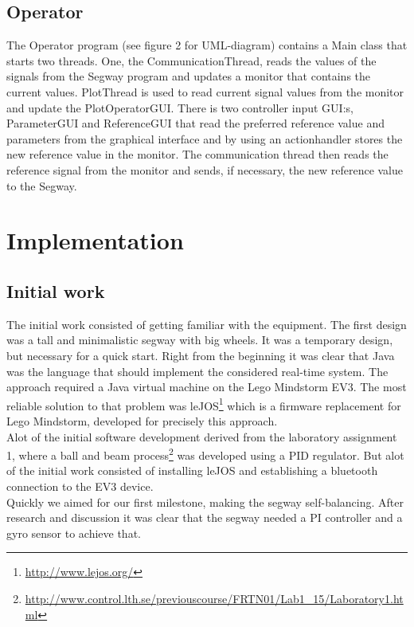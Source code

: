 \subsection{Operator}
The Operator program (see figure 2 for UML-diagram)  contains a Main class that starts two threads. One, the CommunicationThread, reads the values of the signals from the Segway program and updates a monitor that contains the current values. PlotThread is used to read current signal values from the monitor and update the PlotOperatorGUI. There is two controller input GUI:s, ParameterGUI and ReferenceGUI that read the preferred reference value and parameters from the graphical interface and by using an actionhandler stores the new reference value in the monitor. The communication thread then reads the reference signal from the monitor and sends, if necessary, the new reference value to the Segway.

  
\section{Implementation}
\subsection{Initial work}
The initial work consisted of getting familiar with the equipment. The first design was a tall and minimalistic segway with big wheels. It was a temporary design, but necessary for a quick start. Right from the beginning it was clear that Java was the language that should implement the considered real-time system. The approach required a Java virtual machine on the Lego Mindstorm EV3. The most reliable solution to that problem was leJOS\footnote{\url{http://www.lejos.org/}} which is a firmware replacement for Lego Mindstorm, developed for precisely this approach. 
\\[3ex]
Alot of the initial software development derived from the laboratory assignment 1, where a ball and beam process\footnote{\url{http://www.control.lth.se/previouscourse/FRTN01/Lab1_15/Laboratory1.html}} was developed using a PID regulator. But alot of the initial work consisted of installing leJOS and establishing a bluetooth connection to the EV3 device. 
\\[3ex]
Quickly we aimed for our first milestone, making the segway self-balancing. After research and discussion it was clear that the segway needed a PI controller and a gyro sensor to achieve that. 

